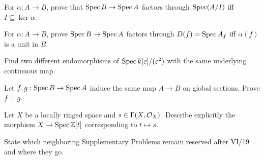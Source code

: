 \begin{exercise}\label{ex:vi19-21}
For $\alpha:A\to B$, prove that $\operatorname{Spec} B\to\operatorname{Spec} A$ factors through $\operatorname{Spec}(A/I)$ iff $I\subseteq\ker\alpha$.
\end{exercise}

\begin{exercise}\label{ex:vi19-22}
For $\alpha:A\to B$, prove $\operatorname{Spec} B\to\operatorname{Spec} A$ factors through $D(f)=\operatorname{Spec} A_f$ iff $\alpha(f)$ is a unit in $B$.
\end{exercise}

\begin{exercise}\label{ex:vi19-23}
Find two different endomorphisms of $\operatorname{Spec} k[\varepsilon]/(\varepsilon^2)$ with the same underlying continuous map.
\end{exercise}

\begin{exercise}\label{ex:vi19-24}
Let $f,g:\operatorname{Spec} B\to\operatorname{Spec} A$ induce the same map $A\to B$ on global sections.  Prove $f=g$.
\end{exercise}

\begin{exercise}\label{ex:vi19-25}
Let $X$ be a locally ringed space and $s\in\Gamma(X,\mathcal O_X)$. Describe explicitly the morphism $X\to\operatorname{Spec}\mathbb Z[t]$ corresponding to $t\mapsto s$.
\end{exercise}

\begin{exercise}\label{ex:vi19-26}
State which neighboring Supplementary Problems remain reserved after VI/19 and where they go.
\end{exercise}
